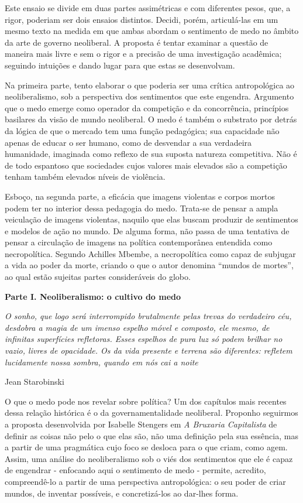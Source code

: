 Este ensaio se divide em duas partes assimétricas e com diferentes
pesos, que, a rigor, poderiam ser dois ensaios distintos. Decidi, porém,
articulá-las em um mesmo texto na medida em que ambas abordam o
sentimento de medo no âmbito da arte de governo neoliberal. A proposta é
tentar examinar a questão de maneira mais livre e sem o rigor e a
precisão de uma investigação acadêmica; seguindo intuições e dando lugar
para que estas se desenvolvam.

Na primeira parte, tento elaborar o que poderia ser uma crítica
antropológica ao neoliberalismo, sob a perspectiva dos sentimentos que
este engendra. Argumento que o medo emerge como operador da competição e
da concorrência, princípios basilares da visão de mundo neoliberal. O
medo é também o substrato por detrás da lógica de que o mercado tem uma
função pedagógica; sua capacidade não apenas de educar o ser humano,
como de desvendar a sua verdadeira humanidade, imaginada como reflexo de
sua suposta natureza competitiva. Não é de todo espantoso que sociedades
cujos valores mais elevados são a competição tenham também elevados
níveis de violência.

Esboço, na segunda parte, a eficácia que imagens violentas e corpos
mortos podem ter no interior dessa pedagogia do medo. Trata-se de pensar
a ampla veiculação de imagens violentas, naquilo que elas buscam
produzir de sentimentos e modelos de ação no mundo. De alguma forma, não
passa de uma tentativa de pensar a circulação de imagens na política
contemporânea entendida como necropolítica. Segundo Achilles Mbembe, a
necropolítica como capaz de subjugar a vida ao poder da morte, criando o
que o autor denomina ``mundos de mortes'', ao qual estão sujeitas partes
consideráveis do globo.

\textbf{Parte I. Neoliberalismo: o cultivo do medo}

\emph{O sonho, que logo será interrompido brutalmente pelas trevas do
verdadeiro céu, desdobra a magia de um imenso espelho móvel e composto,
ele mesmo, de infinitas superfícies refletoras. Esses espelhos de pura
luz só podem brilhar no vazio, livres de opacidade. Os da vida presente
e terrena são diferentes: refletem lucidamente nossa sombra, quando em
nós cai a noite}

Jean Starobinski

O que o medo pode nos revelar sobre política? Um dos capítulos mais
recentes dessa relação histórica é o da governamentalidade neoliberal.
Proponho seguirmos a proposta desenvolvida por Isabelle Stengers em
\emph{A Bruxaria Capitalista} de definir as coisas não pelo o que elas
são, não uma definição pela sua essência, mas a partir de uma pragmática
cujo foco se desloca para o que criam, como agem. Assim, uma análise do
neoliberalismo sob o viés dos sentimentos que ele é capaz de engendrar -
enfocando aqui o sentimento de medo - permite, acredito, compreendê-lo a
partir de uma perspectiva antropológica: o seu poder de criar mundos, de
inventar possíveis, e concretizá-los ao dar-lhes forma.

